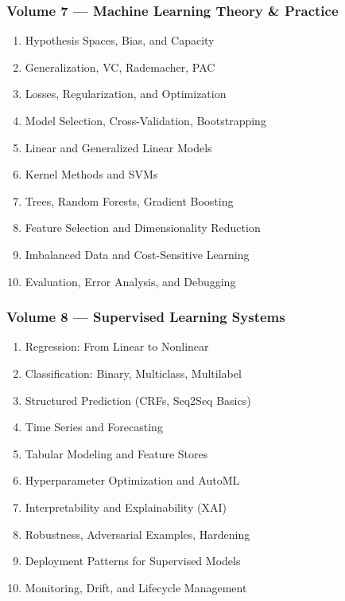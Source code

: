 \documentclass[
  letterpaper,
  DIV=11,
  numbers=noendperiod]{scrreprt}
\providecommand{\tightlist}{%
  \setlength{\itemsep}{0pt}\setlength{\parskip}{0pt}}
\begin{document}
\subsubsection{Volume 7 --- Machine Learning Theory \&
Practice}\label{volume-7-machine-learning-theory-practice}

\begin{enumerate}
\def\labelenumi{\arabic{enumi}.}
\setcounter{enumi}{60}
\tightlist
\item
  Hypothesis Spaces, Bias, and Capacity
\item
  Generalization, VC, Rademacher, PAC
\item
  Losses, Regularization, and Optimization
\item
  Model Selection, Cross-Validation, Bootstrapping
\item
  Linear and Generalized Linear Models
\item
  Kernel Methods and SVMs
\item
  Trees, Random Forests, Gradient Boosting
\item
  Feature Selection and Dimensionality Reduction
\item
  Imbalanced Data and Cost-Sensitive Learning
\item
  Evaluation, Error Analysis, and Debugging
\end{enumerate}

\subsubsection{Volume 8 --- Supervised Learning
Systems}\label{volume-8-supervised-learning-systems}

\begin{enumerate}
\def\labelenumi{\arabic{enumi}.}
\setcounter{enumi}{70}
\tightlist
\item
  Regression: From Linear to Nonlinear
\item
  Classification: Binary, Multiclass, Multilabel
\item
  Structured Prediction (CRFs, Seq2Seq Basics)
\item
  Time Series and Forecasting
\item
  Tabular Modeling and Feature Stores
\item
  Hyperparameter Optimization and AutoML
\item
  Interpretability and Explainability (XAI)
\item
  Robustness, Adversarial Examples, Hardening
\item
  Deployment Patterns for Supervised Models
\item
  Monitoring, Drift, and Lifecycle Management
\end{enumerate}
\end{document}

